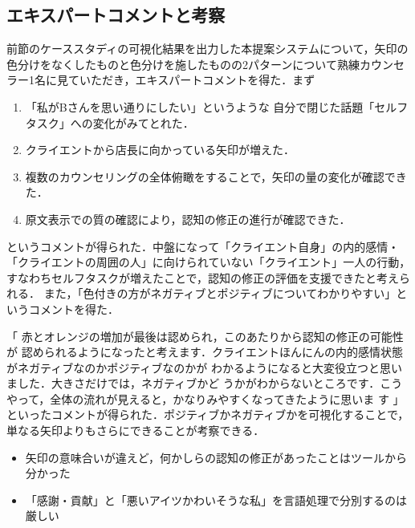 \documentclass[shuuron]{kuee}
\begin{document}
%

\subsection{エキスパートコメントと考察} %

前節のケーススタディの可視化結果を出力した本提案システムについて，矢印の色分けをなくしたものと色分けを施したものの2パターンについて熟練カウンセラー1名に見ていただき，エキスパートコメントを得た．まず
\begin{enumerate}

  \item 「私がBさんを思い通りにしたい」というような
  自分で閉じた話題「セルフタスク」への変化がみてとれた．
  \item クライエントから店長に向かっている矢印が増えた．
  \item 複数のカウンセリングの全体俯瞰をすることで，矢印の量の変化が確認できた．
  \item 原文表示での質の確認により，認知の修正の進行が確認できた．
\end{enumerate}
というコメントが得られた．中盤になって「クライエント自身」の内的感情・「クライエントの周囲の人」に向けられていない「クライエント」一人の行動，すなわちセルフタスクが増えたことで，認知の修正の評価を支援できたと考えられる．
また，「色付きの方がネガティブとポジティブについてわかりやすい」というコメントを得た．


「
赤とオレンジの増加が最後は認められ，このあたりから認知の修正の可能性が
認められるようになったと考えます．クライエントほんにんの内的感情状態がネガティブなのかポジティブなのかが
わかるようになると大変役立つと思いました．大きさだけでは，ネガティブかど
うかがわからないところです．こうやって，全体の流れが見えると，かなりみやすくなってきたように思いま
す
」といったコメントが得られた．ポジティブかネガティブかを可視化することで，単なる矢印よりもさらにできることが考察できる．

\begin{itemize}

  \item 矢印の意味合いが違えど，何かしらの認知の修正があったことはツールから分かった
  \item 「感謝・貢献」と「悪いアイツかわいそうな私」を言語処理で分別するのは厳しい

\end{itemize}
\end{document}
